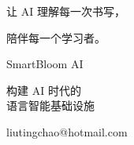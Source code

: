\begin{frame}[plain]

\vfill

\begin{center}

{\SBFontTitle\fontsize{22}{28}\selectfont\color{SBPrimary}
让 AI 理解每一次书写，
}

\vspace{0.30cm}

{\SBFontTitle\fontsize{22}{28}\selectfont\color{SBPrimary}
陪伴每一个学习者。
}

\vspace{0.90cm}

{\SBFontTitle\fontsize{28}{34}\selectfont\color{SBText}
SmartBloom AI
}

\vspace{0.35cm}

{\SBFontTitle\fontsize{16}{20}\selectfont\color{SBText}
构建 AI 时代的\\[0.12cm]
语言智能基础设施
}

\vspace{0.90cm}

{\SBFontBody\fontsize{11}{13}\selectfont\color{SBGray}
liutingchao@hotmail.com
}

\end{center}

\vfill

\end{frame}

